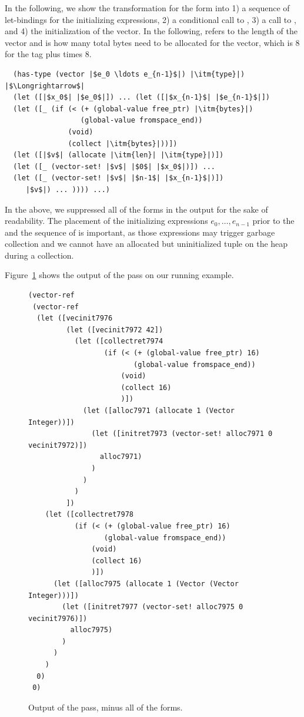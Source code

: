 \documentclass[11pt]{book}
\begin{document}
In the following, we show the transformation for the 
form into 1) a sequence of let-bindings for the initializing
expressions, 2) a conditional call to , 3) a call to
, and 4) the initialization of the vector. In the
following,  refers to the length of the vector and
 is how many total bytes need to be allocated for the
vector, which is 8 for the tag plus  times 8.
\begin{lstlisting}
  (has-type (vector |$e_0 \ldots e_{n-1}$|) |\itm{type}|)
|$\Longrightarrow$|
  (let ([|$x_0$| |$e_0$|]) ... (let ([|$x_{n-1}$| |$e_{n-1}$|])
  (let ([_ (if (< (+ (global-value free_ptr) |\itm{bytes}|)
                  (global-value fromspace_end))
               (void)
               (collect |\itm{bytes}|))])
  (let ([|$v$| (allocate |\itm{len}| |\itm{type}|)])
  (let ([_ (vector-set! |$v$| |$0$| |$x_0$|)]) ...
  (let ([_ (vector-set! |$v$| |$n-1$| |$x_{n-1}$|)])
     |$v$|) ... )))) ...)
\end{lstlisting}
In the above, we suppressed all of the  forms in the
output for the sake of readability.  The placement of the initializing
expressions $e_0,\ldots,e_{n-1}$ prior to the  and the
sequence of  is important, as those expressions may
trigger garbage collection and we cannot have an allocated but
uninitialized tuple on the heap during a collection.

Figure~\ref{fig:expose-alloc-output} shows the output of the
 pass on our running example.

\begin{figure}[tbp]
\begin{lstlisting}
(vector-ref
 (vector-ref
  (let ([vecinit7976
         (let ([vecinit7972 42])
           (let ([collectret7974
                  (if (< (+ (global-value free_ptr) 16) 
                         (global-value fromspace_end))
                      (void)
                      (collect 16)
                      )])
             (let ([alloc7971 (allocate 1 (Vector Integer))])
               (let ([initret7973 (vector-set! alloc7971 0 vecinit7972)])
                 alloc7971)
               )
             )
           )
         ])
    (let ([collectret7978
           (if (< (+ (global-value free_ptr) 16)
                  (global-value fromspace_end))
               (void)
               (collect 16)
               )])
      (let ([alloc7975 (allocate 1 (Vector (Vector Integer)))])
        (let ([initret7977 (vector-set! alloc7975 0 vecinit7976)])
          alloc7975)
        )
      )
    )
  0)
 0)
\end{lstlisting}
\caption{Output of the  pass, minus
  all of the  forms.}
\label{fig:expose-alloc-output}
\end{figure}
\end{document}
